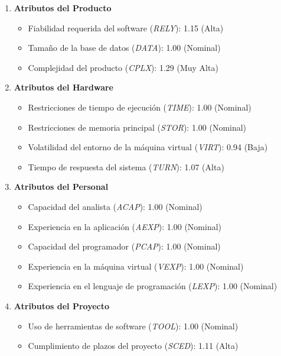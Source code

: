\begin{enumerate}
    \item \textbf{Atributos del Producto}
    \begin{itemize}
        \item Fiabilidad requerida del software (\textit{RELY}): 1.15 (Alta)
        \item Tamaño de la base de datos (\textit{DATA}): 1.00 (Nominal)
        \item Complejidad del producto (\textit{CPLX}): 1.29 (Muy Alta)
    \end{itemize}
    \item \textbf{Atributos del Hardware}
    \begin{itemize}
        \item Restricciones de tiempo de ejecución (\textit{TIME}): 1.00 (Nominal)
        \item Restricciones de memoria principal (\textit{STOR}): 1.00 (Nominal)
        \item Volatilidad del entorno de la máquina virtual (\textit{VIRT}): 0.94 (Baja)
        \item Tiempo de respuesta del sistema (\textit{TURN}): 1.07 (Alta)
    \end{itemize}
    \item \textbf{Atributos del Personal}
    \begin{itemize}
        \item Capacidad del analista (\textit{ACAP}): 1.00 (Nominal)
        \item Experiencia en la aplicación (\textit{AEXP}): 1.00 (Nominal)
        \item Capacidad del programador (\textit{PCAP}): 1.00 (Nominal)
        \item Experiencia en la máquina virtual (\textit{VEXP}): 1.00 (Nominal)
        \item Experiencia en el lenguaje de programación (\textit{LEXP}): 1.00 (Nominal)
    \end{itemize}
    \item \textbf{Atributos del Proyecto}
    \begin{itemize}
        \item Uso de herramientas de software (\textit{TOOL}): 1.00 (Nominal)
        \item Cumplimiento de plazos del proyecto (\textit{SCED}): 1.11 (Alta)
    \end{itemize}
\end{enumerate}

